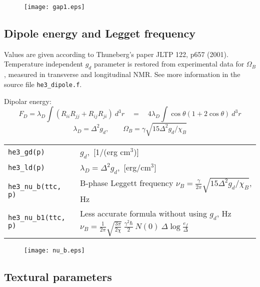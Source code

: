 \documentclass[a4paper]{article}
\begin{document}
\begin{figure}[h]
\texttt{[image: gap1.eps]}\\
\end{figure}
\eject

\subsection*{Dipole energy and Legget frequency}

Values are given according to Thuneberg's paper JLTP 122, p657 (2001).
Temperature independent $g_d$ parameter is restored from experimental
data for $\Omega_B$, measured in transverse and longitudinal NMR.
See more information in the source file {\tt he3\_dipole.f}.

Dipolar energy:
$$
F_D = \lambda_D \int (R_{ii}R_{jj}+R_{ij}R_{ji})\ d^3r
\quad =\quad 4 \lambda_D \int \cos\theta(1+2\cos\theta)\ d^3r
$$
$$
\lambda_D = \Delta^2 g_d,
\qquad \Omega_B = \gamma \sqrt{15 \Delta^2 g_d/\chi_B}
$$

\medskip
\noindent\begin{tabular}{lp{11cm}}
\tt he3\_gd(p) & $g_d$,~[1/(erg cm$^3$)]\\
\tt he3\_ld(p) & $\lambda_D = \Delta^2 g_d$,~[erg/cm$^3$]\\
\tt he3\_nu\_b(ttc, p) &B-phase Leggett frequency
                             $\displaystyle \nu_B = \frac{\gamma}{2\pi}
                               \sqrt{15 \Delta^2 g_d/\chi_B}$, Hz\\

\tt he3\_nu\_b1(ttc, p)  & Less accurate formula without using $g_d$, Hz\newline
                             $\displaystyle \nu_B =\frac{1}{2\pi}\sqrt{\frac{3\pi}{2\chi}}
                             \ \frac{\gamma^2\hbar}{2}\ N(0)\ \Delta \log\frac{e_f}{\Delta}$\\
\end{tabular}
\medskip

\begin{figure}[h]
\texttt{[image: nu\_b.eps]}\\
\end{figure}

\eject
\subsection*{Textural parameters}
\end{document}
